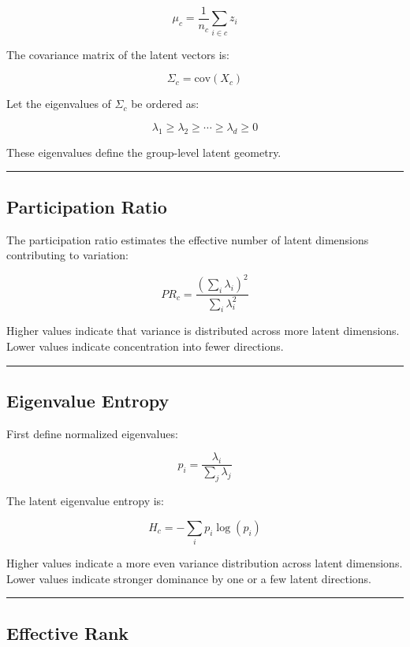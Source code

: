 \documentclass[
  letterpaper,
  DIV=11,
  numbers=noendperiod,
  openany,
  oneside]{scrreprt}
\begin{document}
\[
\mu_c = \frac{1}{n_c} \sum_{i \in c} z_i
\]

The covariance matrix of the latent vectors is:

\[
\Sigma_c = \mathrm{cov}(X_c)
\]

Let the eigenvalues of \(\Sigma_c\) be ordered as:

\[
\lambda_1 \geq \lambda_2 \geq \cdots \geq \lambda_d \geq 0
\]

These eigenvalues define the group-level latent geometry.

\begin{center}\rule{0.5\linewidth}{0.5pt}\end{center}

\subsection{Participation Ratio}\label{participation-ratio}

The participation ratio estimates the effective number of latent
dimensions contributing to variation:

\[
PR_c = \frac{\left(\sum_i \lambda_i\right)^2}{\sum_i \lambda_i^2}
\]

Higher values indicate that variance is distributed across more latent
dimensions. Lower values indicate concentration into fewer directions.

\begin{center}\rule{0.5\linewidth}{0.5pt}\end{center}

\subsection{Eigenvalue Entropy}\label{eigenvalue-entropy}

First define normalized eigenvalues:

\[
p_i = \frac{\lambda_i}{\sum_j \lambda_j}
\]

The latent eigenvalue entropy is:

\[
H_c = -\sum_i p_i \log(p_i)
\]

Higher values indicate a more even variance distribution across latent
dimensions. Lower values indicate stronger dominance by one or a few
latent directions.

\begin{center}\rule{0.5\linewidth}{0.5pt}\end{center}

\subsection{Effective Rank}\label{effective-rank}
\end{document}
